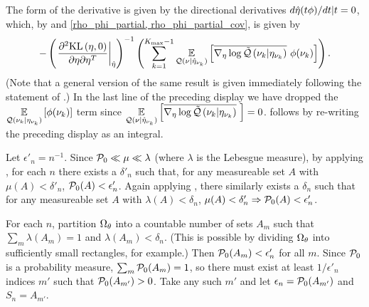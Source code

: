 The form of the derivative is given by the directional derivatives $d \hat\eta(t
\phi) / dt | t = 0$, which, by  and \eqref{rho_phi_partial,
rho_phi_partial_cov}, is given by
%
\begin{align*}
%
-\left(\fracat{\partial^2 \KL{\eta, \phiz}}
                {\partial \eta \partial \eta^T}
                {\etaopt}\right)^{-1}
\left(
    \sumkm \expect{\q(\nu \vert \etaoptnuk)}
                  {\lqgradbar{\nuk \vert \etanuk}
                   \phi(\nuk) }
\right).
%
\end{align*}
%
(Note that a general version of the same result is given immediately following
the statement of \citet[Theorem 4.B(c)]{zeidler:2013:functional}.)  In the last
line of the preceding display we have dropped the $\underset{\mathcal{Q}(\nu_{k} \vert
\eta_{\nu_{k}})}{\mathbb{E}}\left[\phi(\nu_{k})\right]$ term since $\underset{\mathcal{Q}(\nu \vert \hat\eta_{\nu_{k}})}{\mathbb{E}}\left[\overline{{\nabla_\eta \log \tilde{\mathcal{Q}}}\left(\nu_{k} \vert \eta_{\nu_{k}}\right)}\,\,\right] = 0$.   follows by
re-writing the preceding display as an integral.
%





\begin{lem}
%
Let $\epsilon'_n = n^{-1}$.  Since $\mathcal{P}_{0} \ll \mu \ll \lambda$ (where $\lambda$
is the Lebesgue measure), by applying \citet[Proposition
15.5]{nielsen:1997:measure}, for each $n$ there exists a $\delta'_n$ such that,
for any measureable set $A$ with $\mu(A) < \delta'_n$, $\mathcal{P}_{0}(A) <
\epsilon'_n$.  Again applying \citet[Proposition 15.5]{nielsen:1997:measure},
there similarly exists a $\delta_n$ such that for any measureable set $A$ with
$\lambda(A) < \delta_n$, $\mu(A) < \delta'_n \Rightarrow \mathcal{P}_{0}(A) <
\epsilon'_n$.

For each $n$, partition $\Omega_{\theta}$ into a countable number of sets $A_{m}$ such
that $\sum_{m} \lambda(A_{m}) = 1$ and $\lambda(A_{m}) < \delta_n$. (This is
possible by dividing $\Omega_{\theta}$ into sufficiently small rectangles, for
example.)  Then $\mathcal{P}_{0}(A_{m}) < \epsilon'_n$ for all $m$.  Since $\mathcal{P}_{0}$ is a
probability measure, $\sum_m \mathcal{P}_{0}(A_{m}) = 1$, so there must exist at least $1 /
\epsilon'_n$ indices $m'$ such that $\mathcal{P}_{0}(A_{m'}) > 0$. Take any such $m'$ and
let $\epsilon_n = \mathcal{P}_{0}(A_{m'})$ and $S_n = A_{m'}$.

%
\end{lem}
